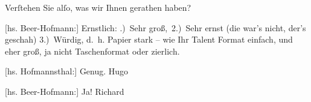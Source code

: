\pstart
           Verſtehen Sie alſo, was wir Ihnen gerathen haben?\pend
           
\pstart
           {[}hs. Beer-Hofmann:{]} Ernstlich:\pend
           \settowidth{\longeste}{3) Ausstattung}\settowidth{\longestz}{entscheiden}\settowidth{\longestd}{}\settowidth{\longestv}{}\settowidth{\longestf}{}\addtolength\longeste{1em}
        \addtolength\longestz{1em}
      \pstart\noindent{}\makebox[\the\longestz][l]{}
                  \pend\pstart\noindent{}
                  \pend\pstart\noindent{}\makebox[\the\longestz][l]{}
                  \pend
{}.) Sehr groß, 2.) Sehr ernst (die war’s nicht, der’s geschah) 3.) Würdig, d. h.
               Papier stark – wie Ihr Talent Format einfach, und eher groß, ja nicht Taschenformat
               oder zierlich.\pend
           
\pstart
           {[}hs. Hofmannsthal:{]} Genug. \spacefill\mbox{Hugo}\pend
           
\pstart
           {[}hs. Beer-Hofmann:{]} Ja! \spacefill\mbox{Richard}\pend
           
\pstart
           \noindent{}\label{T_L01269-1v}\label{T_L01269-1}\pend
           \endnumbering{}  \newcommand{\dateiname}{L01269}\newcommand{\titel}{Hugo von Hofmannsthal und Richard Beer-Hofmann an Arthur Schnitzler, [15.? 2. 1903]}\newcommand{\editorInnen}{Martin Anton Müller und Gerd-Hermann Susen}
